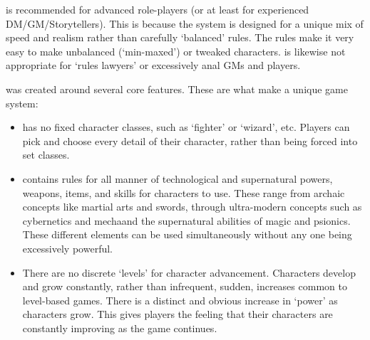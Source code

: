 \documentclass[twoside]{book}
\begin{document}
    {  
    \APATHY{}  is recommended for advanced role-players (or
            at least for experienced DM/GM/Storytellers). This is because
            the \APATHY{}  system is designed for a unique mix of speed
            and realism rather than carefully `balanced'
            rules. The \APATHY{}  rules make it very easy to make
            unbalanced (`min-maxed') or tweaked characters.
            \APATHY{}  is likewise not appropriate for `rules
            lawyers' or excessively anal GMs and players.
          
    }
  
    {  
    \APATHY{}  was created around several core features.
            These are what make \APATHY{}  a unique game system:
          
    }
  
\begin{itemize}
      
  \item   
               
    {  
    \APATHY{}  has no fixed character classes, such as
                `fighter' or `wizard', etc.
                Players can pick and choose every detail of their
                character, rather than being forced into set classes.
              
    }
    
            
  \item   
               
    {  
    \APATHY{}  contains rules for all manner of
                technological and supernatural powers, weapons, items,
                and skills for characters to use. These range from
                archaic concepts like martial arts and swords, through
                ultra-modern concepts such as cybernetics and
                mechaand the supernatural abilities of magic and
                psionics. These different elements can be used
                simultaneously without any one being excessively
                powerful.
              
    }
    
            
  \item   
                
    {  
     There are no discrete `levels' for
                 character advancement. Characters develop and grow
                 constantly, rather than infrequent, sudden, increases
                 common to level-based games. There is a distinct and
                 obvious increase in `power' as characters
                 grow. This gives players the feeling that their
                 characters are constantly improving as the game
                 continues. 
    }
  

\end{itemize}
\end{document}
